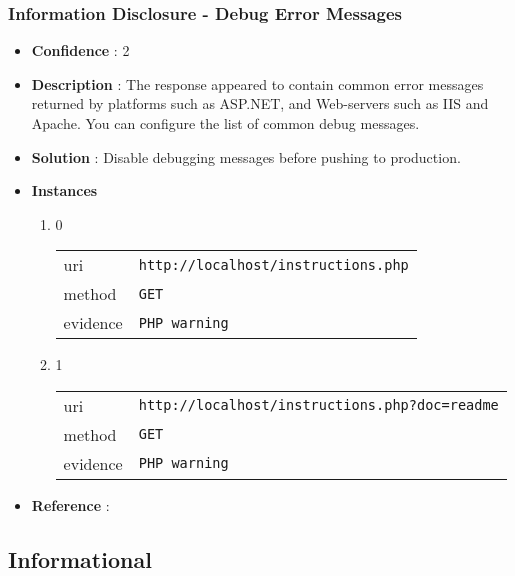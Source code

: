 \documentclass[10pt]{article}
\begin{document}
\subsubsection{Information Disclosure - Debug Error Messages}
\begin{itemize}
\item[] \textbf{Confidence} : 2
\item[] \textbf{Description} : The response appeared to contain common error messages returned by platforms such as ASP.NET, and Web-servers such as IIS and Apache. You can configure the list of common debug messages.
\item[] \textbf{Solution} :  Disable debugging messages before pushing to production.
\item[] \textbf{Instances}
\begin{enumerate}
\item[] 0
\begin{tabular}{| l | p{12cm}}
uri & \texttt{http://localhost/instructions.php} \\
method & \texttt{GET} \\
evidence & \texttt{PHP warning} \\
\end{tabular}
\item[] 1
\begin{tabular}{| l | p{12cm}}
uri & \texttt{http://localhost/instructions.php?doc=readme} \\
method & \texttt{GET} \\
evidence & \texttt{PHP warning} \\
\end{tabular}
\end{enumerate}
\item[] \textbf{Reference} : 
\end{itemize}
\subsection{Informational}
\end{document}
